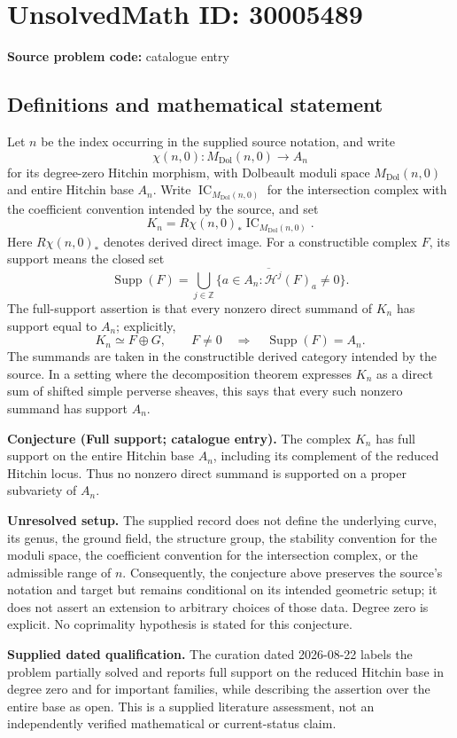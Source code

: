 \documentclass[11pt]{article}
\newcommand{\Z}{\mathbb{Z}}
\begin{document}
\section*{UnsolvedMath ID: 30005489}
\textbf{Source problem code:} catalogue entry
\subsection{Definitions and mathematical statement}
Let \(n\) be the index occurring in the supplied source notation, and write
\[
\chi(n,0)\colon M_{\mathrm{Dol}}(n,0)\longrightarrow A_n
\]
for its degree-zero Hitchin morphism, with Dolbeault moduli space \(M_{\mathrm{Dol}}(n,0)\) and entire Hitchin base \(A_n\). Write \(\operatorname{IC}_{M_{\mathrm{Dol}}(n,0)}\) for the intersection complex with the coefficient convention intended by the source, and set
\[
K_n=R\chi(n,0)_*\operatorname{IC}_{M_{\mathrm{Dol}}(n,0)}.
\]
Here \(R\chi(n,0)_*\) denotes derived direct image. For a constructible complex \(F\), its support means the closed set
\[
\operatorname{Supp}(F)=\overline{\bigcup_{j\in\Z}\{a\in A_n:\mathcal H^j(F)_a\ne0\}}.
\]
The full-support assertion is that every nonzero direct summand of \(K_n\) has support equal to \(A_n\); explicitly,
\[
K_n\simeq F\oplus G,\qquad F\ne0
\quad\Longrightarrow\quad
\operatorname{Supp}(F)=A_n.
\]
The summands are taken in the constructible derived category intended by the source. In a setting where the decomposition theorem expresses \(K_n\) as a direct sum of shifted simple perverse sheaves, this says that every such nonzero summand has support \(A_n\).

\textbf{Conjecture (Full support; catalogue entry).} The complex \(K_n\) has full support on the entire Hitchin base \(A_n\), including its complement of the reduced Hitchin locus. Thus no nonzero direct summand is supported on a proper subvariety of \(A_n\).

\textbf{Unresolved setup.} The supplied record does not define the underlying curve, its genus, the ground field, the structure group, the stability convention for the moduli space, the coefficient convention for the intersection complex, or the admissible range of \(n\). Consequently, the conjecture above preserves the source's notation and target but remains conditional on its intended geometric setup; it does not assert an extension to arbitrary choices of those data. Degree zero is explicit. No coprimality hypothesis is stated for this conjecture.

\textbf{Supplied dated qualification.} The curation dated 2026-08-22 labels the problem partially solved and reports full support on the reduced Hitchin base in degree zero and for important families, while describing the assertion over the entire base as open. This is a supplied literature assessment, not an independently verified mathematical or current-status claim.
\end{document}
